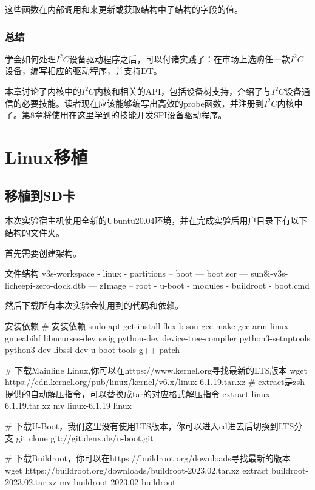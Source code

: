 \documentclass[lang=cn,newtx,10pt,scheme=chinese]{elegantbook}
\begin{document}
这些函数在内部调用和来更新或获取结构中子结构的字段的值。

\section{总结}

学会如何处理$I^2C$设备驱动程序之后，可以付诸实践了：在市场上选购任一款$I^2C$设备，编写相应的驱动程序，并支持DT。

本章讨论了内核中的$I^2C$内核和相关的API，包括设备树支持，介绍了与$I^2C$设备通信的必要技能。读者现在应该能够编写出高效的probe函数，并注册到$I^2C$内核中了。第8章将使用在这里学到的技能开发SPI设备驱动程序。

\part{Linux移植}

\chapter{移植到SD卡}

本次实验宿主机使用全新的Ubuntu20.04环境，并在完成实验后用户目录下有以下结构的文件夹。

首先需要创建架构。

\begin{mycode}{文件结构}
v3s-workspace
- linux
- partitions
-- boot
--- boot.scr
--- sun8i-v3s-licheepi-zero-dock.dtb
--- zImage
-- root
- u-boot
- modules
- buildroot
- boot.cmd
\end{mycode}

然后下载所有本次实验会使用到的代码和依赖。

\begin{mycode}{安装依赖}
# 安装依赖
sudo apt-get install flex bison gcc make gcc-arm-linux-gnueabihf libncurses-dev swig python-dev device-tree-compiler python3-setuptools python3-dev libssl-dev u-boot-tools g++ patch

# 下载Mainline Linux,你可以在https://www.kernel.org寻找最新的LTS版本
wget https://cdn.kernel.org/pub/linux/kernel/v6.x/linux-6.1.19.tar.xz
# extract是zsh提供的自动解压指令，可以替换成tar的对应格式解压指令
extract linux-6.1.19.tar.xz
mv linux-6.1.19 linux

# 下载U-Boot，我们这里没有使用LTS版本，你可以进入cd进去后切换到LTS分支
git clone git://git.denx.de/u-boot.git

# 下载Buildroot，你可以在https://buildroot.org/downloads寻找最新的版本
wget https://buildroot.org/downloads/buildroot-2023.02.tar.xz
extract buildroot-2023.02.tar.xz
mv buildroot-2023.02 buildroot
\end{mycode}
\end{document}
